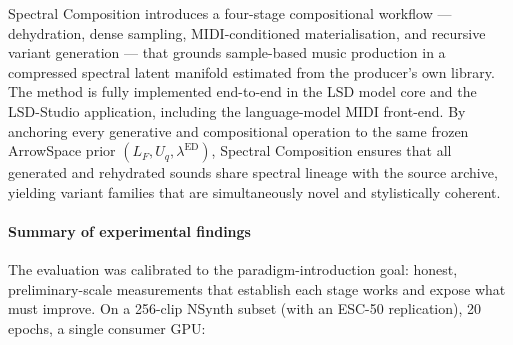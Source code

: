 \documentclass[12pt,a4paper]{article}
\begin{document}
Spectral Composition introduces a four-stage compositional workflow —
dehydration, dense sampling, MIDI-conditioned materialisation, and
recursive variant generation — that grounds sample-based music production
in a compressed spectral latent manifold estimated from the producer's
own library. The method is fully implemented end-to-end in the LSD
model core and the LSD-Studio application, including the
language-model MIDI front-end. By anchoring every generative
and compositional operation to the same frozen ArrowSpace prior
$(L_F, U_q, \lambda^{\mathrm{ED}})$, Spectral Composition ensures that
all generated and rehydrated sounds share spectral lineage with the
source archive, yielding variant families that are simultaneously novel
and stylistically coherent.

\paragraph{Summary of experimental findings}
The evaluation was calibrated to the paradigm-introduction goal:
honest, preliminary-scale measurements that establish each stage works
and expose what must improve. On a 256-clip NSynth subset (with an
ESC-50 replication), 20 epochs, a single consumer GPU:
\end{document}
